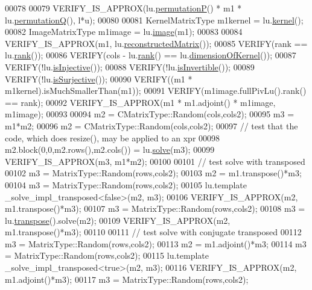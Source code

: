 \begin{DoxyCode}
00078 
00079   VERIFY\_IS\_APPROX(lu.\hyperlink{group___l_u___module_a09274c82240f6441af5e6c99e24e756d}{permutationP}() * m1 * lu.\hyperlink{group___l_u___module_a8d18190c7618de271cba7293f0493a36}{permutationQ}(), l*u);
00080 
00081   KernelMatrixType m1kernel = lu.\hyperlink{group___l_u___module_a70f52eeb2cd07dfbf790fce106fb4015}{kernel}();
00082   ImageMatrixType m1image = lu.\hyperlink{group___l_u___module_a0893985d2dab367baa6e57c6fd0c4956}{image}(m1);
00083 
00084   VERIFY\_IS\_APPROX(m1, lu.\hyperlink{group___l_u___module_a191a4f598b0c192a83ab48984e87ee51}{reconstructedMatrix}());
00085   VERIFY(rank == lu.\hyperlink{group___l_u___module_a67a870aa69e699e058d04802ba0bdad9}{rank}());
00086   VERIFY(cols - lu.\hyperlink{group___l_u___module_a67a870aa69e699e058d04802ba0bdad9}{rank}() == lu.\hyperlink{group___l_u___module_a64e191225834e91161ea53ad4b78167b}{dimensionOfKernel}());
00087   VERIFY(!lu.\hyperlink{group___l_u___module_ab13992c852aa593461d9b81790b56667}{isInjective}());
00088   VERIFY(!lu.\hyperlink{group___l_u___module_afdf2579c93473650f2ef2a47a376c4a0}{isInvertible}());
00089   VERIFY(!lu.\hyperlink{group___l_u___module_a1f6222875fc3a181ee1544b9b36dfda5}{isSurjective}());
00090   VERIFY((m1 * m1kernel).isMuchSmallerThan(m1));
00091   VERIFY(m1image.fullPivLu().rank() == rank);
00092   VERIFY\_IS\_APPROX(m1 * m1.adjoint() * m1image, m1image);
00093 
00094   m2 = CMatrixType::Random(cols,cols2);
00095   m3 = m1*m2;
00096   m2 = CMatrixType::Random(cols,cols2);
00097   \textcolor{comment}{// test that the code, which does resize(), may be applied to an xpr}
00098   m2.block(0,0,m2.rows(),m2.cols()) = lu.\hyperlink{group___l_u___module_af563471f6f3283fd10779ef02dd0b748}{solve}(m3);
00099   VERIFY\_IS\_APPROX(m3, m1*m2);
00100 
00101   \textcolor{comment}{// test solve with transposed}
00102   m3 = MatrixType::Random(rows,cols2);
00103   m2 = m1.transpose()*m3;
00104   m3 = MatrixType::Random(rows,cols2);
00105   lu.template \_solve\_impl\_transposed<false>(m2, m3);
00106   VERIFY\_IS\_APPROX(m2, m1.transpose()*m3);
00107   m3 = MatrixType::Random(rows,cols2);
00108   m3 = lu.\hyperlink{class_eigen_1_1_solver_base_a732e75b5132bb4db3775916927b0e86c}{transpose}().solve(m2);
00109   VERIFY\_IS\_APPROX(m2, m1.transpose()*m3);
00110 
00111   \textcolor{comment}{// test solve with conjugate transposed}
00112   m3 = MatrixType::Random(rows,cols2);
00113   m2 = m1.adjoint()*m3;
00114   m3 = MatrixType::Random(rows,cols2);
00115   lu.template \_solve\_impl\_transposed<true>(m2, m3);
00116   VERIFY\_IS\_APPROX(m2, m1.adjoint()*m3);
00117   m3 = MatrixType::Random(rows,cols2);

\end{DoxyCode}
